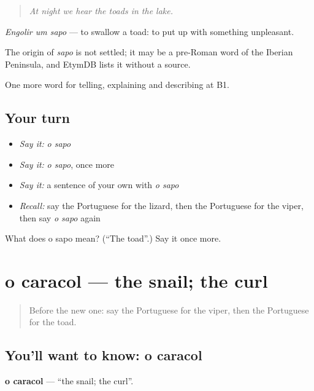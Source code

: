 \begin{quote}
\emph{At night we hear the toads in the lake.}
\end{quote}

\emph{Engolir um sapo} — to swallow a toad: to put up with something unpleasant.

\begin{cousinweb}
The origin of \emph{sapo} is not settled; it may be a pre-Roman word of the Iberian Peninsula, and EtymDB lists it without a source.
\end{cousinweb}

\begin{grammarlens}[title={What you've built}]
One more word for telling, explaining and describing at B1.
\end{grammarlens}

\subsection*{Your turn}
\begin{itemize}
\raggedright
  \item \emph{Say it:} \emph{o sapo}
  \item \emph{Say it:} \emph{o sapo}, once more
  \item \emph{Say it:} a sentence of your own with \emph{o sapo}
  \item \emph{Recall:} say the Portuguese for the lizard, then the Portuguese for the viper, then say \emph{o sapo} again
\end{itemize}

\begin{tcolorbox}[breakable,colback=teal!4,colframe=teal!35!black,title={Before you move on}]
What does o sapo mean? (\textquotedblleft{}The toad\textquotedblright{}.) Say it once more.
\end{tcolorbox}
\section[o caracol]{o caracol — the snail; the curl}

\label{lesson:PT-C461-caracol}



\begin{quote}
Before the new one: say the Portuguese for the viper, then the Portuguese for the toad.
\end{quote}

\subsection*{You'll want to know: o caracol}
\textbf{o caracol} — \textquotedblleft{}the snail; the curl\textquotedblright{}.


